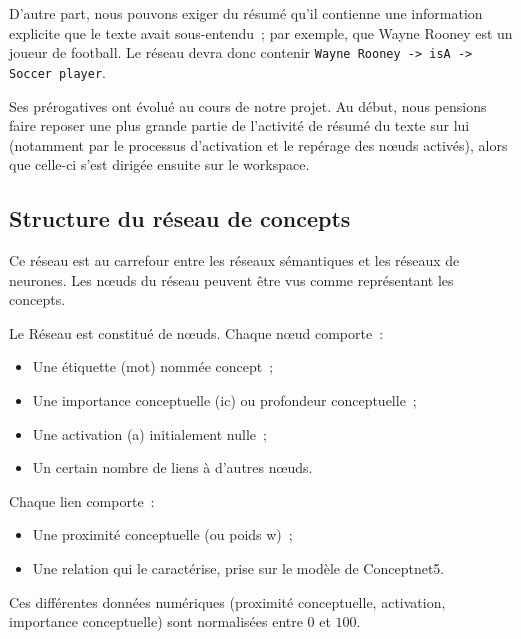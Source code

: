 \documentclass[a4paper, 12pt]{article}
\begin{document}
D'autre part, nous pouvons exiger du résumé qu'il contienne une information explicite que le texte avait sous-entendu~; par exemple, que Wayne Rooney est un joueur de football. Le réseau devra donc contenir \verb|Wayne Rooney -> isA -> Soccer player|.

Ses prérogatives ont évolué au cours de notre projet. Au début, nous pensions faire reposer une plus grande partie de l'activité de résumé du texte sur lui (notamment par le processus d'activation et le repérage des nœuds activés), alors que celle-ci s'est dirigée ensuite sur le workspace.


\subsection{Structure du réseau de concepts}

\begin{definition}
Ce réseau est au carrefour entre les réseaux sémantiques et les réseaux de neurones. Les nœuds du réseau peuvent être vus comme représentant les concepts.
\end{definition}

Le Réseau est constitué de n\oe{}uds. Chaque n\oe{}ud comporte~:
\begin{itemize}
  \item Une étiquette (mot) nommée concept~;
 \item Une importance conceptuelle (ic) ou profondeur conceptuelle~;
 \item Une activation (a) initialement nulle~;
 \item Un certain nombre de liens à d'autres n\oe{}uds.
\end{itemize}

Chaque lien comporte~:
\begin{itemize}
 \item Une proximité conceptuelle (ou poids w)~;
 \item Une relation qui le caractérise, prise sur le modèle de Conceptnet5.
\end{itemize}

Ces différentes données numériques (proximité conceptuelle, activation, importance conceptuelle) sont normalisées entre $0$ et $100$.
\end{document}
